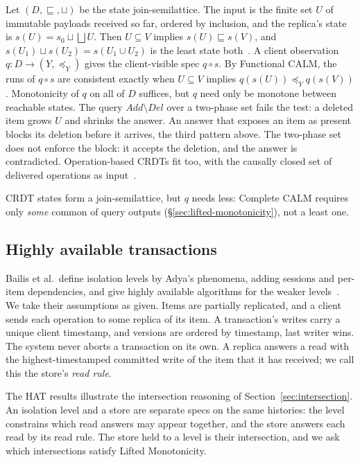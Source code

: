 Let $(D,\sqsubseteq,\sqcup)$ be the state join-semilattice.  The input is the
finite set $U$ of immutable payloads received so far, ordered by inclusion, and
the replica's state is $s(U)=s_0\sqcup\bigsqcup U$.  Then $U\subseteq V$
implies $s(U)\sqsubseteq s(V)$, and $s(U_1)\sqcup s(U_2)=s(U_1\cup U_2)$ is the
least state \outrelpart both~\cite{shapiro2011crdt}.  A client observation
$q:D\to(Y,\preceq_Y)$ gives the client-visible spec $q\circ s$.  By
Functional CALM, the runs of $q\circ s$ are consistent exactly when $U\subseteq V$ implies
$q(s(U))\preceq_Y q(s(V))$.  Monotonicity of $q$ on all of $D$ suffices, but
$q$ need only be monotone between reachable states.  The query $\mathit{Add}\setminus\mathit{Del}$ over a two-phase set fails the test: a deleted item grows $U$ and shrinks the answer.  An answer that exposes an item as
present blocks its deletion before it arrives, the third pattern above.  The
two-phase set does not enforce the block: it accepts the deletion, and the
answer is contradicted.
Operation-based CRDTs fit too, with the causally closed set of
delivered operations as
input~\cite{shapiro2011crdt,burckhardt2014replicated,baquero2014operation,hellerstein2025turtles}.

CRDT states form a join-semilattice, but $q$ needs less:
Complete CALM requires only \emph{some} common \outnoun of query outputs
(\S\ref{sec:lifted-monotonicity}), not a least one.

\subsection{Highly available transactions}
\label{sec:hat-instance}

Bailis et al.\ define isolation levels by Adya's phenomena, adding sessions and
per-item dependencies, and give highly available algorithms for the weaker
levels~\cite{bailis2013hat,adya1999weakconsistency}.  We take their
assumptions as given.  Items are partially replicated, and a client sends each
operation to some replica of its item.  A transaction's writes carry a unique
client timestamp, and versions are ordered by timestamp, last writer wins.
The system never aborts a transaction on its own.  A replica answers a read
with the highest-timestamped committed write of the item that it has received;
we call this the store's \emph{read rule}.

The HAT results illustrate the intersection reasoning of
Section~\ref{sec:intersection}.  An isolation level and a store are separate
specs on the same histories: the level constrains which read answers may
appear together, and the store answers each read by its read rule.  The store
held to a level is their intersection, and we ask which intersections satisfy
Lifted Monotonicity.

